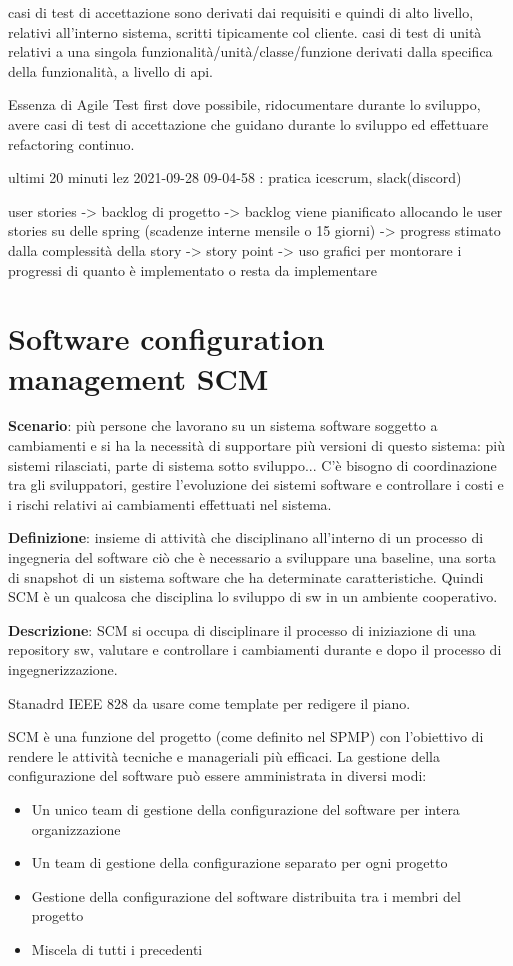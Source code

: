 \documentclass[10pt,a4paper]{book}
\begin{document}
casi di test di accettazione sono derivati dai requisiti e quindi di alto livello, relativi all'interno sistema, scritti tipicamente col cliente.
casi di test di unità relativi a una singola funzionalità/unità/classe/funzione derivati dalla specifica della funzionalità, a livello di api.


Essenza di Agile
Test first dove possibile, ridocumentare durante lo sviluppo, avere casi di test di accettazione che guidano durante lo sviluppo ed effettuare refactoring continuo.



ultimi 20 minuti lez 2021-09-28 09-04-58 : pratica icescrum, slack(discord)

user stories -> backlog di progetto -> backlog viene pianificato allocando le user stories su delle spring (scadenze interne mensile o 15 giorni) -> progress stimato dalla complessità della story -> story point -> uso grafici per montorare i progressi di quanto è implementato o resta da implementare

\newpage
\section{Software configuration management SCM}
\textbf{Scenario}: più persone che lavorano su un sistema software soggetto a cambiamenti e si ha la necessità di supportare più versioni di questo sistema: più sistemi rilasciati, parte di sistema sotto sviluppo...
C'è bisogno di coordinazione tra gli sviluppatori, gestire l'evoluzione dei sistemi software e controllare i costi e i rischi relativi ai cambiamenti effettuati nel sistema.

\textbf{Definizione}: insieme di attività che disciplinano all'interno di un processo di ingegneria del software ciò che è necessario a sviluppare una baseline, una sorta di snapshot di un sistema software che ha determinate caratteristiche. Quindi SCM è un qualcosa che disciplina lo sviluppo di sw in un ambiente cooperativo.

\textbf{Descrizione}: SCM si occupa di disciplinare il processo di iniziazione di una repository sw, valutare e controllare i cambiamenti durante e dopo il processo di ingegnerizzazione.

Stanadrd IEEE 828 da usare come template per redigere il piano.

SCM è una funzione del progetto (come definito nel SPMP) con l'obiettivo di rendere le attività tecniche e manageriali più efficaci.
La gestione della configurazione del software può essere amministrata in diversi modi:
\begin{itemize}
\item Un unico team di gestione della configurazione del software per intera organizzazione
\item Un team di gestione della configurazione separato per ogni progetto
\item Gestione della configurazione del software distribuita tra i membri del progetto
\item Miscela di tutti i precedenti
\end{itemize}
\end{document}
